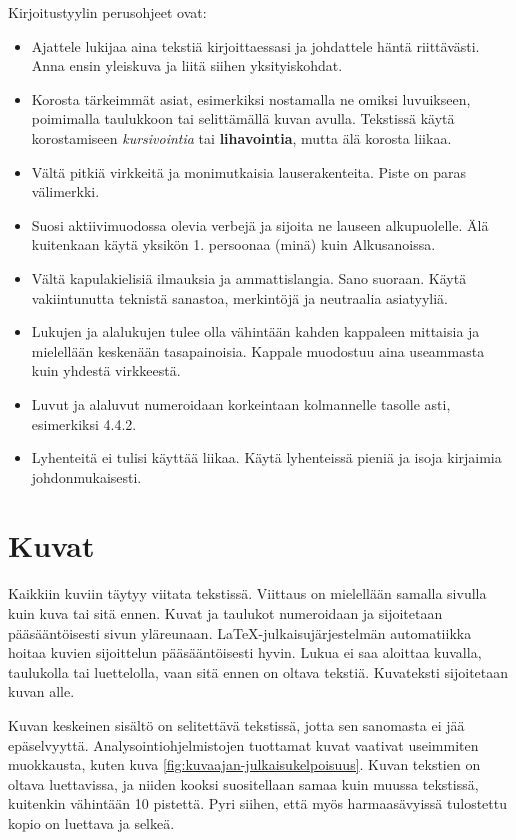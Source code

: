 \documentclass[globalnumbering,centeredcaptions]{tutthesis/tutthesis} %
\begin{document}
Kirjoitustyylin perusohjeet ovat:
\begin{itemize} %
  \item Ajattele lukijaa aina tekstiä kirjoittaessasi ja johdattele häntä riittävästi. Anna ensin yleiskuva ja liitä siihen yksityiskohdat. 
  \item Korosta tärkeimmät asiat, esimerkiksi nostamalla ne omiksi luvuikseen, poimimalla taulukkoon tai selittämällä kuvan avulla. Tekstissä käytä korostamiseen \emph{kursivointia} tai \textbf{lihavointia}, mutta älä korosta liikaa.
  \item Vältä pitkiä virkkeitä ja monimutkaisia lauserakenteita. Piste on paras välimerkki. 
  \item Suosi aktiivimuodossa olevia verbejä ja sijoita ne lauseen alkupuolelle. Älä kuitenkaan käytä yksikön 1. persoonaa (minä) kuin Alkusanoissa. 
  \item Vältä kapulakielisiä ilmauksia ja ammattislangia. Sano suoraan. Käytä vakiintunutta teknistä sanastoa, merkintöjä ja neutraalia asiatyyliä. 
  \item Lukujen ja alalukujen tulee olla vähintään kahden kappaleen mittaisia ja mielellään keskenään tasapainoisia. Kappale muodostuu aina useammasta kuin yhdestä virkkeestä. 
  \item Luvut ja alaluvut numeroidaan korkeintaan kolmannelle tasolle asti, esimerkiksi 4.4.2.
  \item Lyhenteitä ei tulisi käyttää liikaa. Käytä lyhenteissä pieniä ja isoja kirjaimia johdonmukaisesti. 
\end{itemize}

\section{Kuvat}

Kaikkiin kuviin täytyy viitata tekstissä.
Viittaus on mielellään samalla sivulla kuin kuva tai sitä ennen.
Kuvat ja taulukot numeroidaan ja sijoitetaan pääsääntöisesti sivun yläreunaan.
LaTeX-julkaisujärjestelmän automatiikka hoitaa kuvien sijoittelun pääsääntöisesti hyvin.
Lukua ei saa aloittaa kuvalla, taulukolla tai luettelolla, vaan sitä ennen on oltava tekstiä.
Kuvateksti sijoitetaan kuvan alle.

Kuvan keskeinen sisältö on selitettävä tekstissä, jotta sen sanomasta ei jää epäselvyyttä.
Analysointiohjelmistojen tuottamat kuvat vaativat useimmiten muokkausta, kuten kuva \ref{fig:kuvaajan-julkaisukelpoisuus}.
Kuvan tekstien on oltava luettavissa, ja niiden kooksi suositellaan samaa kuin muussa tekstissä, kuitenkin vähintään 10 pistettä.
Pyri siihen, että myös harmaasävyissä tulostettu kopio on luettava ja selkeä.
\end{document}
